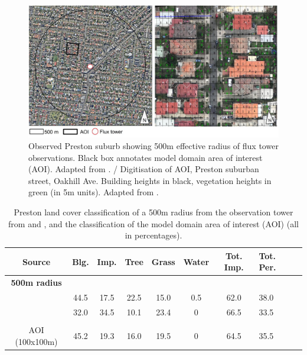 \documentclass[final,3p,times,authoryear]{elsarticle}
\begin{document}
\begin{figure}[!htbp]
\includegraphics[trim = 0mm 0mm 0mm 0mm, clip, scale=1.00]{images/PrestonModelledArea.png} 
\caption{Observed Preston suburb showing 500m effective radius of flux tower observations. Black box annotates model domain area of interest (AOI). Adapted from \cite{GooglePreston2015}.\label{fig:PrestonModArea} / Digitisation of AOI, Preston suburban street, Oakhill Ave. Building heights in black, vegetation heights in green (in 5m units). Adapted from \cite{Nearmap2015}.\label{fig:PrestonDigitization}}      
\end{figure}



\begin{table}[!htbp]
\caption
{Preston land cover classification of a 500m radius from the observation tower from \cite{Coutts2007} and \cite{Nury2015}, and the classification of the model domain area of interest (AOI) (all in percentages). \label{tab:expertValues}} 
\begin{tabular}{ |c |c| c | c |c |c |c|p{1.65cm}|p{1.65cm}| } 
\hline \textbf{Source} & \textbf{Blg.}&	\textbf{Imp.}&\textbf{Tree}&\textbf{Grass}	&\textbf{Water}&\textbf{Tot. Imp.}&\textbf{Tot. Per.} \\ \hline
\textbf{500m radius} & & & & & &	&  \\ \hline 
\cite{Coutts2007} &44.5 &17.5&22.5 &15.0 &0.5 &62.0 &38.0	  \\ \hline 
\cite{Nury2015} &32.0 &34.5 &10.1 &23.4 &0 &66.5 &33.5  \\ \hline 
 & & & & & &	&  \\ \hline 
AOI (100x100m) &45.2 &19.3 &16.0 &19.5 &0 &64.5	&35.5  \\ \hline 
\end{tabular} 
\end{table}  
 
\end{document}
